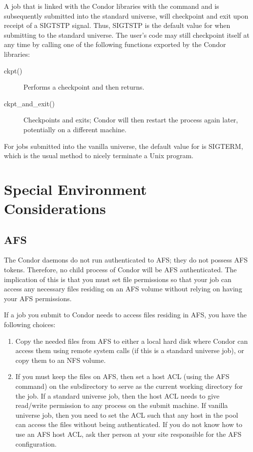 A job that is linked with the Condor libraries with the 
command
and is subsequently submitted into the standard universe, 
will checkpoint and exit upon receipt of a SIGTSTP signal.
Thus, SIGTSTP is
the default value for  when submitting to the standard
universe.
The user's code may still checkpoint itself at any time
by calling one of the following functions exported by the Condor libraries:
\begin{description}
\item[ckpt()] Performs a checkpoint and then returns.
\item[ckpt\_and\_exit()] Checkpoints and exits; Condor will then
restart the process again later, potentially on a different machine.
\end{description}

For jobs submitted into the vanilla universe, the default value for
 is SIGTERM,
which is the usual method to nicely terminate a Unix program.

\section{Special Environment Considerations}

\subsection{AFS}

The Condor daemons do not run authenticated to AFS; they do not possess
AFS tokens.
Therefore, no child process of Condor will be AFS authenticated.
The implication of this is that you must set file permissions so
that your job can access any necessary files residing on an AFS volume
without relying on having your AFS permissions.

If a job you submit to Condor needs to access files residing in AFS,
you have the following choices:
\begin{enumerate}
\item Copy the needed files from AFS to either a local hard disk where 
Condor can access them using remote system calls (if
this is a standard universe job), or copy them to an NFS volume.
\item If you must keep the files on AFS, then set a host ACL
(using the AFS  command) on the subdirectory to
serve as the current working directory for the job.
If a standard universe job, then the host ACL needs
to give read/write permission to any process on the submit machine.
If vanilla universe job, then you need to set the ACL such that any host 
in the pool can access the files without being authenticated.
If you do not know how to use an AFS host ACL, ask ther person at your 
site responsible for the AFS configuration.
\end{enumerate}


